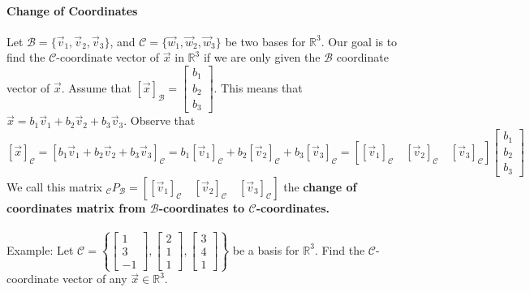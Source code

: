 \documentclass[10pt,letter]{article}
\begin{document}
\paragraph{Change of Coordinates} Let $\mathcal{B}=\{\vec{v}_1,\vec{v}_2,\vec{v}_3\}$, and $\mathcal{C}=\{\vec{w}_1,\vec{w}_2,\vec{w}_3\}$ be two bases for $\mathbb{R}^3$. Our goal is to find the $\mathcal{C}$-coordinate vector of $\vec{x}$ in $\mathbb{R}^3$ if we are only given the $\mathcal{B}$ coordinate vector of $\vec{x}$. Assume that $[\vec{x}]_\mathcal{B}=\begin{bmatrix}b_1\\b_2\\b_3\end{bmatrix}$. This means that $\vec{x}=b_1\vec{v}_1+b_2\vec{v}_2+b_3\vec{v}_3$. Observe that $$[\vec{x}]_\mathcal{C}=[b_1\vec{v}_1+b_2\vec{v}_2+b_3\vec{v}_3]_\mathcal{C}=b_1[\vec{v}_1]_\mathcal{C}+b_2[\vec{v}_2]_\mathcal{C}+b_3[\vec{v}_3]_\mathcal{C}=\left[[\vec{v}_1]_\mathcal{C}\quad[\vec{v}_2]_\mathcal{C}\quad[\vec{v}_3]_\mathcal{C}\right]\begin{bmatrix}b_1\\b_2\\b_3\end{bmatrix}$$ We call this matrix $_\mathcal{C}P_\mathcal{B}=\left[[\vec{v}_1]_\mathcal{C}\quad[\vec{v}_2]_\mathcal{C}\quad[\vec{v}_3]_\mathcal{C}\right]$ the \textbf{change of coordinates matrix from $\mathcal{B}$-coordinates to $\mathcal{C}$-coordinates.} \\ \\
Example: Let $\mathcal{C}=\left\{\begin{bmatrix}1\\3\\-1\end{bmatrix},\begin{bmatrix}2\\1\\1\end{bmatrix},\begin{bmatrix}3\\4\\1\end{bmatrix}\right\}$ be a basis for $\mathbb{R}^3$. Find the $\mathcal{C}$-coordinate vector of any $\vec{x}\in\mathbb{R}^3$. \\ 
\end{document}

